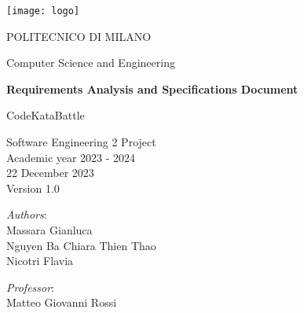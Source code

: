 \begin{titlingpage}
	\begin{center}
		\texttt{[image: logo]}
		
		\vspace{0.25cm}
		
		\LARGE POLITECNICO DI MILANO\\
		
		\vspace{0.2cm}
		
		\Large Computer Science and Engineering
		
		\vspace{0.8cm}
	
		\Huge \textbf{Requirements Analysis and Specifications Document}
		
		\vspace{0.5cm}
		\huge CodeKataBattle
		
		\vspace{1.5cm}
		\LARGE Software Engineering 2 Project\\
		\Large Academic year 2023 - 2024\\
		\vspace{1cm}
		22 December 2023\\Version 1.0
		\vspace{2.5cm}
		
		\large
		\begin{minipage}{.1\textwidth}
			\null
		\end{minipage}%
		\begin{minipage}{.4\textwidth}
			\textit{Authors}:\\
			Massara Gianluca\\
			Nguyen Ba Chiara Thien Thao\\
			Nicotri Flavia
		\end{minipage}%
		\begin{minipage}{.4\textwidth}
			\raggedleft	
			\textit{Professor}:\\
			Matteo Giovanni Rossi\\
			\phantom{placeholder}
		\end{minipage}%
		\begin{minipage}{.1\textwidth}
			\null
		\end{minipage}
	
			
		\end{center}
\end{titlingpage}